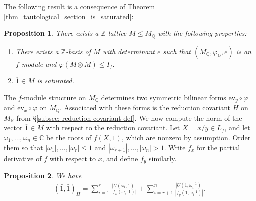 \documentclass{article} %
\newtheorem{proposition}{Proposition}[section]
\numberwithin{equation}{section}
\newcommand{\R}{\mathbb{R}}
\newcommand{\Q}{\mathbb{Q}}
\begin{document}
The following result is a consequence of Theorem \ref{thm_tautological_section_is_saturated}:
\begin{proposition}\label{prop_prepnormof1computation}
    There exists a $\mathbb{Z}$-lattice $M \leq M_\mathbb{Q}$ with the following properties:
    \begin{enumerate}
        \item There exists a $\mathbb{Z}$-basis of $M$ with determinant $e$ such that $(M_\mathbb{Q}, \varphi_\mathbb{Q}, e)$ is an $f$-module and $\varphi(M \otimes M) \leq I_f$.
        \item $\overline{1} \in M$ is saturated.
    \end{enumerate}
\end{proposition}
The $f$-module structure on $M_{\Q}$ determines two symmetric bilinear forms $\mathrm{ev}_y\circ \varphi$ and $\mathrm{ev}_x \circ \varphi$ on $M_{\Q}$.
Associated with these forms is the reduction covariant $H$ on $M_{\R}$ from \S\ref{subsec: reduction covariant def}.
We now compute the norm of the vector $\overline{1} \in M$ with respect to the reduction covariant. Let $X = x / y \in L_f$, and let $\omega_1, \dots, \omega_n \in \mathbb{C}$ be the roots of $f(X, 1)$, which are nonzero by assumption.
Order them so that $|\omega_1|, \dots, |\omega_r|\leq 1$ and $|\omega_{r+1}|, \dots, |\omega_n|> 1$.
Write $f_x$ for the partial derivative of $f$ with respect to $x$, and define $f_y$ similarly.
\begin{proposition}\label{prop_normof1}
    We have
    \begin{align}\label{equation_normof1}
     (\bar{1},\bar{1})_H = \sum_{i=1}^r \frac{| U(\omega_i, 1) |}{| f_x(\omega_i, 1)|} + \sum_{i=r+1}^n \frac{| U(1, \omega_i^{-1}) |}{| f_y(1, \omega_i^{-1})|}.   
    \end{align}
\end{proposition}
\end{document}
